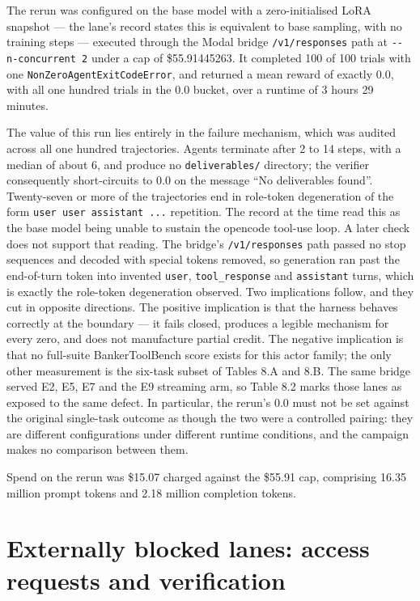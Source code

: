 \documentclass[12pt,a4paper]{report}
\begin{document}
The rerun was configured on the base model with a zero-initialised LoRA
snapshot --- the lane's record states this is equivalent to base
sampling, with no training steps --- executed through the Modal bridge
\texttt{/v1/responses} path at \texttt{-\/-n-concurrent\ 2} under a cap
of \$55.91445263. It completed 100 of 100 trials with one
\texttt{NonZeroAgentExitCodeError}, and returned a mean reward of
exactly 0.0, with all one hundred trials in the 0.0 bucket, over a
runtime of 3 hours 29 minutes.

The value of this run lies entirely in the failure mechanism, which was
audited across all one hundred trajectories. Agents terminate after 2 to
14 steps, with a median of about 6, and produce no
\texttt{deliverables/} directory; the verifier consequently
short-circuits to 0.0 on the message ``No deliverables found''.
Twenty-seven or more of the trajectories end in role-token degeneration
of the form \texttt{user\ user\ assistant\ ...} repetition. The record
at the time read this as the base model being unable to sustain the
opencode tool-use loop. A later check does not support that reading. The
bridge's \texttt{/v1/responses} path passed no stop sequences and
decoded with special tokens removed, so generation ran past the
end-of-turn token into invented \texttt{user}, \texttt{tool\_response}
and \texttt{assistant} turns, which is exactly the role-token
degeneration observed. Two implications follow, and they cut in opposite
directions. The positive implication is that the harness behaves
correctly at the boundary --- it fails closed, produces a legible
mechanism for every zero, and does not manufacture partial credit. The
negative implication is that no full-suite BankerToolBench score exists
for this actor family; the only other measurement is the six-task subset
of Tables 8.A and 8.B. The same bridge served E2, E5, E7 and the E9
streaming arm, so Table 8.2 marks those lanes as exposed to the same
defect. In particular, the rerun's 0.0 must not be set against the
original single-task outcome as though the two were a controlled
pairing: they are different configurations under different runtime
conditions, and the campaign makes no comparison between them.

Spend on the rerun was \$15.07 charged against the \$55.91 cap,
comprising 16.35 million prompt tokens and 2.18 million completion
tokens.

\section{Externally blocked lanes: access requests and
verification}\label{externally-blocked-lanes-access-requests-and-verification}
\end{document}
